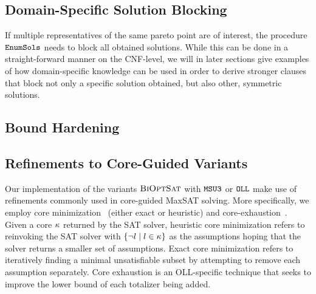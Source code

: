 \subsection{Domain-Specific Solution Blocking}

If multiple representatives of the same pareto point are of interest, the procedure $\texttt{EnumSols}$ needs to block all obtained solutions. 
While this can be done in a straight-forward manner on the CNF-level, we will in later sections give examples of how domain-specific knowledge can be used in order to derive stronger clauses that block not only a specific solution obtained, but also other, symmetric solutions.

\subsection{Bound Hardening}


\subsection{Refinements to Core-Guided Variants}

Our implementation of the variants $\textsc{BiOptSat}$ with $\texttt{MSU3}$ or $\texttt{OLL}$ make use of refinements commonly used in core-guided MaxSAT solving.
More specifically, we employ core minimization~\autocite{DBLP:journals/jsat/IgnatievMM19} (either exact or heuristic) and core-exhaustion~\autocite{DBLP:journals/jsat/IgnatievMM19,DBLP:conf/cp/AnsoteguiBGL13}.
Given a core $\kappa$ returned by the SAT solver, heuristic core minimization refers to reinvoking the SAT solver with $\{\lnot l \mid l \in \kappa\}$ as the assumptions hoping that the solver returns a smaller set of assumptions.
Exact core minimization refers to iteratively finding a minimal unsatisfiable subset by attempting to remove each assumption separately.
Core exhaustion is an OLL-specific technique that seeks to improve the lower bound of each totalizer being added.
